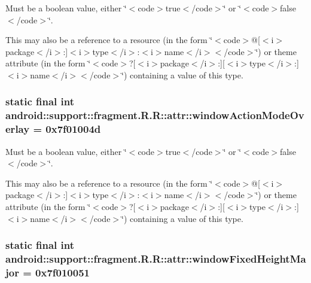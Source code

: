 Must be a boolean value, either \char`\"{}$<$code$>$true$<$/code$>$\char`\"{} or \char`\"{}$<$code$>$false$<$/code$>$\char`\"{}. 

This may also be a reference to a resource (in the form \char`\"{}$<$code$>$@\mbox{[}$<$i$>$package$<$/i$>$:\mbox{]}$<$i$>$type$<$/i$>$:$<$i$>$name$<$/i$>$$<$/code$>$\char`\"{}) or theme attribute (in the form \char`\"{}$<$code$>$?\mbox{[}$<$i$>$package$<$/i$>$:\mbox{]}\mbox{[}$<$i$>$type$<$/i$>$:\mbox{]}$<$i$>$name$<$/i$>$$<$/code$>$\char`\"{}) containing a value of this type. \hypertarget{classandroid_1_1support_1_1fragment_1_1_r_1_1attr_44802a8ed606725dc7283cc8e00a35d7}{
\subsubsection[{windowActionModeOverlay}]{\setlength{\rightskip}{0pt plus 5cm}static final int android::support::fragment.R.R::attr::windowActionModeOverlay = 0x7f01004d}}
\label{classandroid_1_1support_1_1fragment_1_1_r_1_1attr_44802a8ed606725dc7283cc8e00a35d7}


Must be a boolean value, either \char`\"{}$<$code$>$true$<$/code$>$\char`\"{} or \char`\"{}$<$code$>$false$<$/code$>$\char`\"{}. 

This may also be a reference to a resource (in the form \char`\"{}$<$code$>$@\mbox{[}$<$i$>$package$<$/i$>$:\mbox{]}$<$i$>$type$<$/i$>$:$<$i$>$name$<$/i$>$$<$/code$>$\char`\"{}) or theme attribute (in the form \char`\"{}$<$code$>$?\mbox{[}$<$i$>$package$<$/i$>$:\mbox{]}\mbox{[}$<$i$>$type$<$/i$>$:\mbox{]}$<$i$>$name$<$/i$>$$<$/code$>$\char`\"{}) containing a value of this type. \hypertarget{classandroid_1_1support_1_1fragment_1_1_r_1_1attr_ab2180112e8fafc94426e8e0e184f635}{
\subsubsection[{windowFixedHeightMajor}]{\setlength{\rightskip}{0pt plus 5cm}static final int android::support::fragment.R.R::attr::windowFixedHeightMajor = 0x7f010051}}
\label{classandroid_1_1support_1_1fragment_1_1_r_1_1attr_ab2180112e8fafc94426e8e0e184f635}


